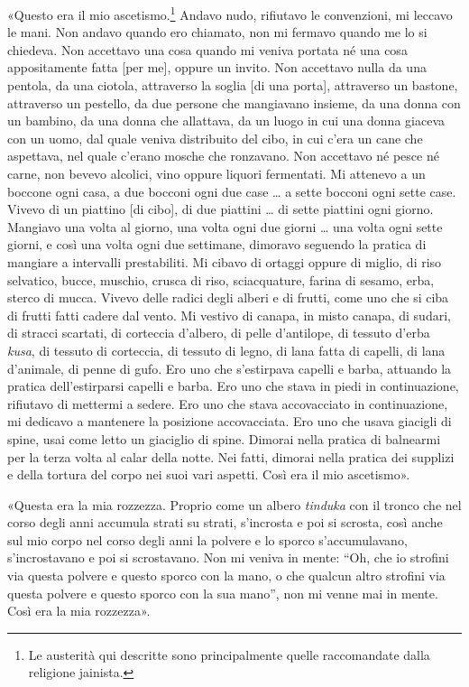 «Questo era il mio ascetismo.\footnote{Le austerità qui descritte sono principalmente quelle raccomandate dalla religione jainista.}
Andavo nudo, rifiutavo le
convenzioni, mi leccavo le mani. Non andavo quando ero chiamato, non mi
fermavo quando me lo si chiedeva. Non accettavo una cosa quando mi
veniva portata né una cosa appositamente fatta [per me], oppure un
invito. Non accettavo nulla da una pentola, da una ciotola, attraverso
la soglia [di una porta], attraverso un bastone, attraverso un pestello,
da due persone che mangiavano insieme, da una donna con un bambino, da
una donna che allattava, da un luogo in cui una donna giaceva con un
uomo, dal quale veniva distribuito del cibo, in cui c’era un cane che
aspettava, nel quale c’erano mosche che ronzavano. Non accettavo né
pesce né carne, non bevevo alcolici, vino oppure liquori fermentati. Mi
attenevo a un boccone ogni casa, a due bocconi ogni due case … a sette
bocconi ogni sette case. Vivevo di un piattino [di cibo], di due
piattini … di sette piattini ogni giorno. Mangiavo una volta al giorno,
una volta ogni due giorni … una volta ogni sette giorni, e così una
volta ogni due settimane, dimoravo seguendo la pratica di mangiare a
intervalli prestabiliti. Mi cibavo di ortaggi oppure di miglio, di riso
selvatico, bucce, muschio, crusca di riso, sciacquature, farina di
sesamo, erba, sterco di mucca. Vivevo delle radici degli alberi e di
frutti, come uno che si ciba di frutti fatti cadere dal vento. Mi
vestivo di canapa, in misto canapa, di sudari, di stracci scartati, di
corteccia d’albero, di pelle d’antilope, di tessuto d’erba \emph{kusa}, di
tessuto di corteccia, di tessuto di legno, di lana fatta di capelli, di
lana d’animale, di penne di gufo. Ero uno che s’estirpava capelli e
barba, attuando la pratica dell’estirparsi capelli e barba. Ero uno che
stava in piedi in continuazione, rifiutavo di mettermi a sedere. Ero uno
che stava accovacciato in continuazione, mi dedicavo a mantenere la
posizione accovacciata. Ero uno che usava giacigli di spine, usai come
letto un giaciglio di spine. Dimorai nella pratica di balnearmi per la
terza volta al calar della notte. Nei fatti, dimorai nella pratica dei
supplizi e della tortura del corpo nei suoi vari aspetti. Così era il
mio ascetismo».


«Questa era la mia rozzezza. Proprio come un albero \emph{tinduka} con il
tronco che nel corso degli anni accumula strati su strati, s’incrosta e
poi si scrosta, così anche sul mio corpo nel corso degli anni la polvere
e lo sporco s’accumulavano, s’incrostavano e poi si scrostavano. Non mi
veniva in mente: “Oh, che io strofini via questa polvere e questo sporco
con la mano, o che qualcun altro strofini via questa polvere e questo
sporco con la sua mano”, non mi venne mai in mente. Così era la mia
rozzezza».


